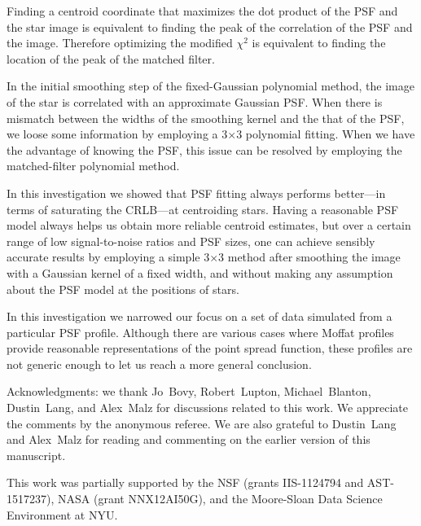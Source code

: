 \documentclass[onecolumn]{aastex61}
\newcommand{\todo}[1]{{\textcolor{dred}{ #1}}}
\begin{document}
Finding a centroid coordinate that maximizes the dot product of the PSF and the star image is equivalent to finding the peak of the correlation of the PSF and the image. Therefore optimizing the modified $\chi^2$ is equivalent to finding the location of the peak of the matched filter. 

\todo{In the initial smoothing step of the fixed-Gaussian polynomial method, the image of the star is correlated with an approximate Gaussian PSF.} When there is mismatch between the widths of the smoothing kernel and the that of the PSF, we loose some information by employing a 3$\times$3 polynomial fitting. When we have the advantage of knowing the PSF, this issue can be resolved by employing the matched-filter polynomial method.

\todo{In this investigation we showed that PSF fitting always performs better---in terms of saturating the CRLB---at centroiding stars.} Having a reasonable PSF model always helps us obtain more reliable centroid estimates, but over a certain range of low signal-to-noise ratios and PSF sizes, one can achieve sensibly accurate results by employing a simple 3$\times$3 method after smoothing the image with a Gaussian kernel of a fixed width, and without making any assumption about the PSF model at the positions of stars.

In this investigation we narrowed our focus on a set of data simulated from a particular PSF profile. Although there are various cases where Moffat profiles provide reasonable representations of the point spread function, these profiles are not generic enough to let us reach a more general conclusion.

\acknowledgments

Acknowledgments: we thank Jo~Bovy, Robert~Lupton, Michael~Blanton, Dustin~Lang, and Alex~Malz for discussions related to this work. 
We appreciate the comments by the anonymous referee.
We are also grateful to Dustin~Lang and Alex~Malz for reading 
and commenting on the earlier version of this manuscript.

This work was partially supported by the NSF (grants IIS-1124794 and AST-1517237), NASA (grant NNX12AI50G), and the Moore-Sloan Data Science Environment at NYU. 




\clearpage
\end{document}

